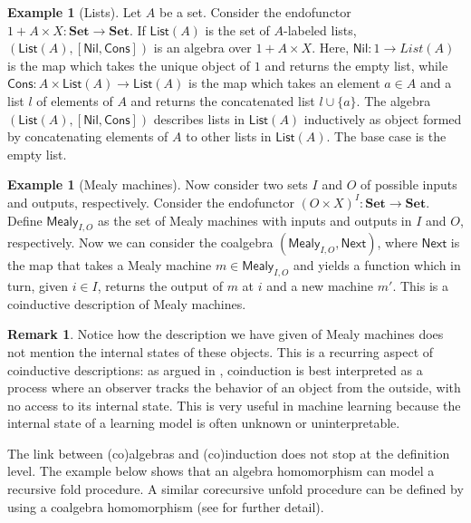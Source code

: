 \documentclass[11pt,a4paper,openright,twoside]{report}
\newcounter{mycounter}
\theoremstyle{plain}
\theoremstyle{definition}
\newtheorem{remark}[mycounter]{Remark}
\newtheorem{example}[mycounter]{Example}
\begin{document}
\begin{example}[Lists]
  \label{ex: lists}
  Let $A$ be a set. Consider the endofunctor $1 + A \times X: \mathbf{Set} \to \mathbf{Set}$. If $\mathsf{List}(A)$ is the set of $A$-labeled lists, $(\mathsf{List}(A), [\mathsf{Nil}, \mathsf{Cons}])$ is an algebra over $1 + A \times X$. Here, $\mathsf{Nil}: 1 \to {List}(A)$ is the map which takes the unique object of $1$ and returns the empty list, while $\mathsf{Cons}: A \times \mathsf{List}(A) \to \mathsf{List}(A)$ is the map which takes an element $a \in A$ and a list $l$ of elements of $A$ and returns the concatenated list $l \cup \{a\}$. The algebra $(\mathsf{List}(A), [\mathsf{Nil}, \mathsf{Cons}])$ describes lists in $\mathsf{List}(A)$ inductively as object formed by concatenating elements of $A$ to other lists in $\mathsf{List}(A)$. The base case is the empty list.
\end{example}

\begin{example}[Mealy machines]
  \label{ex: mealy}
  Now consider two sets $I$ and $O$ of possible inputs and outputs, respectively. Consider the endofunctor $(O \times X)^I: \mathbf{Set} \to \mathbf{Set}$.  Define $\mathsf{Mealy}_{I,O}$ as the set of Mealy machines with inputs and outputs in $I$ and $O$, respectively. Now we can consider the coalgebra $(\mathsf{Mealy}_{I,O}, \mathsf{Next})$, where $\mathsf{Next}$ is the map that takes a Mealy machine $m \in \mathsf{Mealy}_{I,O}$ and yields a function which in turn, given $i \in I$, returns the output of $m$ at $i$ and a new machine $m'$. This is a coinductive description of Mealy machines.
\end{example}

\begin{remark}
  Notice how the description we have given of Mealy machines does not mention the internal states of these objects. This is a recurring aspect of coinductive descriptions: as argued in \cite{jacobs1997tutorial}, coinduction is best interpreted as a process where an observer tracks the behavior of an object from the outside, with no access to its internal state. This is very useful in machine learning because the internal state of a learning model is often unknown or uninterpretable.
\end{remark}

The link between (co)algebras and (co)induction does not stop at the definition level. The example below shows that an algebra homomorphism can model a recursive fold procedure. A similar corecursive unfold procedure can be defined by using a coalgebra homomorphism (see \cite{gavranovicposition} for further detail).
\end{document}

